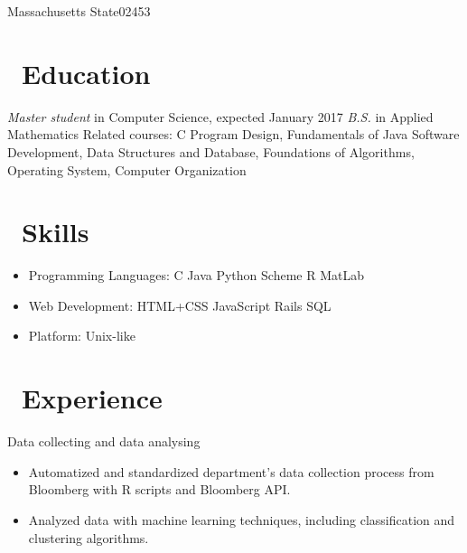 \documentclass{resume}
\begin{document}


\address{116 Russell Street}{Massachusetts State}{02453}
 
\section{\faGraduationCap\ Education}
\textit{Master student} in Computer Science, expected January 2017
\textit{B.S.} in Applied Mathematics
\newline
Related courses: C Program Design, Fundamentals of Java Software Development, Data Structures and Database, Foundations of Algorithms, Operating System, Computer Organization

\section{\faCogs\ Skills}
\begin{itemize}[parsep=0.5ex]
  \item Programming Languages: C Java Python Scheme R MatLab
  \item Web Development: HTML+CSS JavaScript Rails SQL
  \item Platform: Unix-like
\end{itemize}


\section{\faUsers\ Experience}

Data collecting and data analysing
\begin{itemize}
  \item Automatized and standardized department's data collection process from Bloomberg with R scripts and Bloomberg API.
  \item Analyzed data with machine learning techniques, including classification and clustering algorithms.
\end{itemize}
\end{document}
